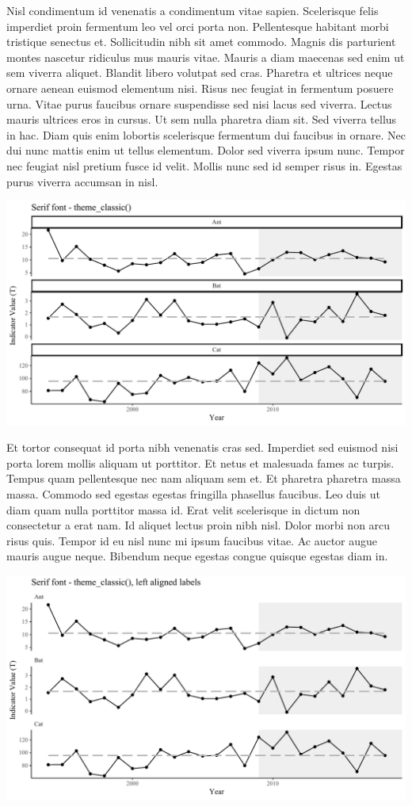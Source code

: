 \documentclass[11pt,]{article}
\begin{document}
Nisl condimentum id venenatis a condimentum vitae sapien. Scelerisque
felis imperdiet proin fermentum leo vel orci porta non. Pellentesque
habitant morbi tristique senectus et. Sollicitudin nibh sit amet
commodo. Magnis dis parturient montes nascetur ridiculus mus mauris
vitae. Mauris a diam maecenas sed enim ut sem viverra aliquet. Blandit
libero volutpat sed cras. Pharetra et ultrices neque ornare aenean
euismod elementum nisi. Risus nec feugiat in fermentum posuere urna.
Vitae purus faucibus ornare suspendisse sed nisi lacus sed viverra.
Lectus mauris ultrices eros in cursus. Ut sem nulla pharetra diam sit.
Sed viverra tellus in hac. Diam quis enim lobortis scelerisque fermentum
dui faucibus in ornare. Nec dui nunc mattis enim ut tellus elementum.
Dolor sed viverra ipsum nunc. Tempor nec feugiat nisl pretium fusce id
velit. Mollis nunc sed id semper risus in. Egestas purus viverra
accumsan in nisl.

\includegraphics{font_test_files/figure-latex/unnamed-chunk-2-1.pdf}

Et tortor consequat id porta nibh venenatis cras sed. Imperdiet sed
euismod nisi porta lorem mollis aliquam ut porttitor. Et netus et
malesuada fames ac turpis. Tempus quam pellentesque nec nam aliquam sem
et. Et pharetra pharetra massa massa. Commodo sed egestas egestas
fringilla phasellus faucibus. Leo duis ut diam quam nulla porttitor
massa id. Erat velit scelerisque in dictum non consectetur a erat nam.
Id aliquet lectus proin nibh nisl. Dolor morbi non arcu risus quis.
Tempor id eu nisl nunc mi ipsum faucibus vitae. Ac auctor augue mauris
augue neque. Bibendum neque egestas congue quisque egestas diam in.

\includegraphics{font_test_files/figure-latex/unnamed-chunk-3-1.pdf}
\end{document}
